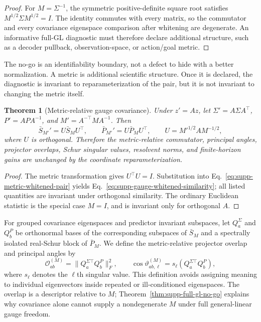 \documentclass{article}
\newtheorem{supptheorem}{Theorem}
\begin{document}
\begin{proof}
For $M=\Sigma^{-1}$, the symmetric positive-definite square root satisfies
$M^{1/2}\Sigma M^{1/2}=I$. The identity commutes with every matrix, so the
commutator and every covariance eigenspace comparison after whitening are
degenerate. An informative full-GL diagnostic must therefore declare
additional structure, such as a decoder pullback, observation-space, or
action/goal metric.
\end{proof}

The no-go is an identifiability boundary, not a defect to hide with a better
normalization. A metric is additional scientific structure. Once it is
declared, the diagnostic is invariant to reparameterization of the pair, but
it is not invariant to changing the metric itself.

\begin{supptheorem}[Metric-relative gauge covariance]
\label{thm:supp-metric-gauge}
Under $z'=Az$, let
$\Sigma'=A\Sigma A^\top$, $P'=APA^{-1}$, and
$M'=A^{-\top}MA^{-1}$. Then
\begin{equation}
\label{eq:supp-gauge-whitened-similarity}
\bar S_{M'}'=U\bar S_MU^\top,\qquad
\bar P_{M'}'=U\bar P_MU^\top,
\qquad U=M'^{1/2}AM^{-1/2},
\end{equation}
where $U$ is orthogonal. Therefore the metric-relative commutator,
principal angles, projector overlaps, Schur singular values, resolvent norms,
and finite-horizon gains are unchanged by the coordinate reparameterization.
\end{supptheorem}

\begin{proof}
The metric transformation gives $U^\top U=I$. Substitution into
Eq.~\eqref{eq:supp-metric-whitened-pair} yields
Eq.~\eqref{eq:supp-gauge-whitened-similarity}; all listed quantities are
invariant under orthogonal similarity. The ordinary Euclidean statistic is the
special case $M=I$, and is invariant only for orthogonal $A$.
\end{proof}

For grouped covariance eigenspaces and predictor invariant subspaces, let
$Q_a^\Sigma$ and $Q_b^P$ be orthonormal bases of the corresponding subspaces
of $\bar S_M$ and a spectrally isolated real-Schur block of $\bar P_M$.
We define the metric-relative projector overlap and principal angles by
\begin{equation}
\label{eq:supp-projector-overlap}
\mathcal O_{ab}^{(M)}=\|Q_a^{\Sigma\top}Q_b^P\|_F^2,
\qquad
\cos\vartheta_{ab,\ell}^{(M)}=
s_\ell(Q_a^{\Sigma\top}Q_b^P),
\end{equation}
where $s_\ell$ denotes the $\ell$th singular value. This definition avoids
assigning meaning to individual eigenvectors inside repeated or ill-conditioned
eigenspaces. The overlap is a descriptor relative to $M$; Theorem~\ref{thm:supp-full-gl-no-go}
explains why covariance alone cannot supply a nondegenerate $M$ under full
general-linear gauge freedom.
\end{document}

